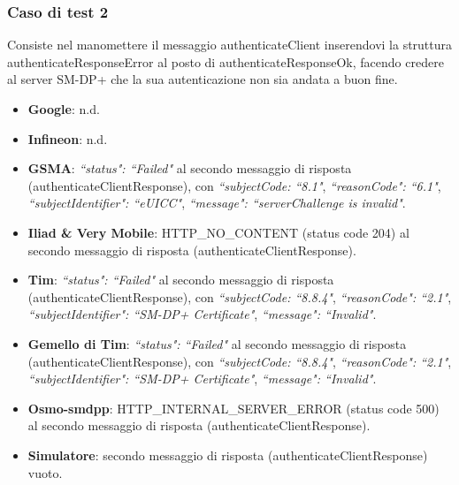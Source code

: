 \documentclass[10pt, oneside]{book}
\begin{document}
\subsubsection{Caso di test 2}
Consiste nel manomettere il messaggio authenticateClient inserendovi la struttura authenticateResponseError al posto di authenticateResponseOk, facendo credere al server SM-DP+ che la sua autenticazione non sia andata a buon fine.
\begin{itemize}
\item \textbf{Google}: n.d.
\item \textbf{Infineon}: n.d.
\item \textbf{GSMA}: \textit{``status": ``Failed"} al secondo messaggio di risposta (authenticateClientResponse), con \textit{``subjectCode: ``8.1"}, \textit{``reasonCode": ``6.1"}, \textit{``subjectIdentifier": ``eUICC"}, \textit{``message": ``serverChallenge is invalid"}.
\item \textbf{Iliad \& Very Mobile}: HTTP\_NO\_CONTENT (status code 204) al secondo messaggio di risposta (authenticateClientResponse).
\item \textbf{Tim}: \textit{``status": ``Failed"} al secondo messaggio di risposta (authenticateClientResponse), con \textit{``subjectCode: ``8.8.4"}, \textit{``reasonCode": ``2.1"}, \textit{``subjectIdentifier": ``SM-DP+ Certificate"}, \textit{``message": ``Invalid"}.
\item \textbf{Gemello di Tim}: \textit{``status": ``Failed"} al secondo messaggio di risposta (authenticateClientResponse), con \textit{``subjectCode: ``8.8.4"}, \textit{``reasonCode": ``2.1"}, \textit{``subjectIdentifier": ``SM-DP+ Certificate"}, \textit{``message": ``Invalid"}.
\item \textbf{Osmo-smdpp}: HTTP\_INTERNAL\_SERVER\_ERROR (status code 500) al secondo messaggio di risposta (authenticateClientResponse).
\item \textbf{Simulatore}: secondo messaggio di risposta (authenticateClientResponse) vuoto.
\end{itemize}
\end{document}
